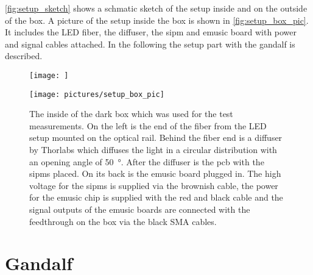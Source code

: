 \autoref{fig:setup_sketch} shows a schmatic sketch of the setup inside and on the outside of the box.
A picture of the setup inside the box is shown in \autoref{fig:setup_box_pic}.
It includes the LED fiber, the diffuser, the \ac{sipm} and \ac{emusic} board with power and signal cables attached.
In the following the setup part with the \ac{gandalf} is described.
\begin{figure}
	\centering
	\texttt{[image: ]}
	\caption[]{}
	\label{fig:setup_sketch}
\end{figure}
\begin{figure}
	\centering
	\texttt{[image: pictures/setup\_box\_pic]}
	\caption[Picture of the inside of the dark box.]{The inside of the dark box which was used for the test measurements. On the left is the end of the fiber from the LED setup mounted on the optical rail. Behind the fiber end is a diffuser by Thorlabs which diffuses the light in a circular distribution with an opening angle of \SI{50}{\degree}. After the diffuser is the \ac{pcb} with the \acp{sipm} placed. On its back is the \ac{emusic} board plugged in. The high voltage for the \acp{sipm} is supplied via the brownish cable, the power for the \ac{emusic} chip is supplied with the red and black cable and the signal outputs of the \ac{emusic} boards are connected with the feedthrough on the box via the black SMA cables.}
	\label{fig:setup_box_pic}
\end{figure}

\section{Gandalf}

